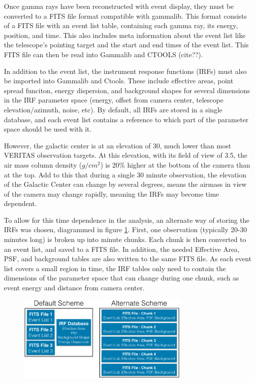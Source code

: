 Once gamma rays have been reconstructed with event display, they must be converted to a FITS file format compatible with gammalib.
This format consists of a FITS file with an event list table, containing each gamma ray, its energy, position, and time.
This also includes meta information about the event list like the telescope's pointing target and the start and end times of the event list.
This FITS file can then be read into Gammalib and CTOOLS (cite??).

In addition to the event list, the instrument response functions (IRFs) must also be imported into Gammalib and Ctools.
These include effective areas, point spread funciton, energy dispersion, and background shapes for several dimensions in the IRF parameter space (energy, offset from camera center, telescope elevation/azimuth, noise, etc).
By default, all IRFs are stored in a single database, and each event list contains a reference to which part of the parameter space should be used with it.

However, the galactic center is at an elevation of 30\degree, much lower than most VERITAS observation targets.
At this elevation, with its field of view of 3.5\degree, the air mass column density ($g/cm^{2}$) is 20\% higher at the bottom of the camera than at the top.
Add to this that during a single 30 minute observation, the elevation of the Galactic Center can change by several degrees, means the airmass in view of the camera may change rapidly, meaning the IRFs may become time dependent.

To allow for this time dependence in the analysis, an alternate way of storing the IRFs was chosen, diagrammed in figure \ref{fig:fits_scheme}.
First, one observation (typically 20-30 minutes long) is broken up into  minute chunks.
Each chunk is then converted to an event list, and saved to a FITS file.
In addition, the needed Effective Area, PSF, and background tables are also written to the same FITS file.
As each event list covers a small region in time, the IRF tables only need to contain the dimensions of the parameter space that can change during one chunk, such as event energy and distance from camera center.

\begin{figure}[ht]
  \begin{center}
    \includegraphics[width=0.75\textwidth]{images/FITS_diagrams_alternate_scheme.eps}
    \caption[FITS File Event Storage Schemes]{}\label{fig:fits_scheme}
  \end{center}
\end{figure}

